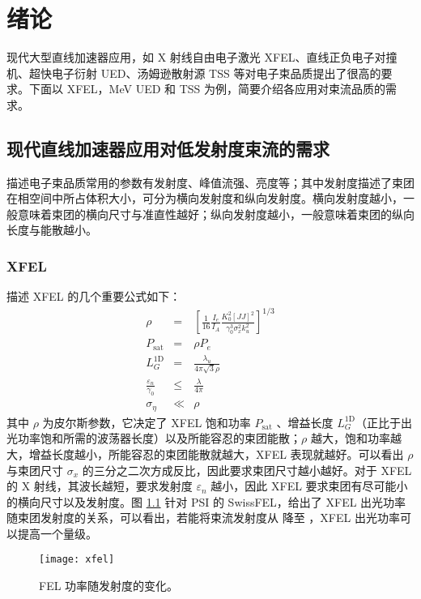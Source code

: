 \chapter{绪论}
\label{chap:intro}

现代大型直线加速器应用，如 X 射线自由电子激光 XFEL、直线正负电子对撞机、超快电子衍射 UED、汤姆逊散射源 TSS 等对电子束品质提出了很高的要求。下面以 XFEL，MeV UED 和 TSS 为例，简要介绍各应用对束流品质的需求。

\section{现代直线加速器应用对低发射度束流的需求}
描述电子束品质常用的参数有发射度、峰值流强、亮度等；其中发射度描述了束团在相空间中所占体积大小，可分为横向发射度和纵向发射度。横向发射度越小，一般意味着束团的横向尺寸与准直性越好；纵向发射度越小，一般意味着束团的纵向长度与能散越小。
\subsection{XFEL}
描述 XFEL 的几个重要公式如下\cite{Huang:2007aa}：
\begin{eqnarray}
\rho &=& \left[\frac{1}{16}\frac{I_e}{I_A}\frac{K_0^2[JJ]^2}{\gamma_0^3\sigma_x^2k_u^2}\right]^{1/3}\\
P_{\text{sat}} &=& \rho P_e\\
L^{\text{1D}}_{G} &=& \frac{\lambda_u}{4\pi\sqrt{3}\rho}\\
\frac{\varepsilon_n}{\gamma_0} &\le& \frac{\lambda}{4\pi}\\
\sigma_{\eta} &\ll& \rho
\end{eqnarray}
其中 $\rho$ 为皮尔斯参数，它决定了 XFEL 饱和功率 $P_{\text{sat}}$ 、增益长度 $L^{\text{1D}}_{G}$（正比于出光功率饱和所需的波荡器长度）以及所能容忍的束团能散；$\rho$ 越大，饱和功率越大，增益长度越小，所能容忍的束团能散就越大，XFEL 表现就越好。可以看出 $\rho$ 与束团尺寸 $\sigma_x$ 的三分之二次方成反比，因此要求束团尺寸越小越好。对于 XFEL 的 X 射线，其波长越短，要求发射度 $\varepsilon_n$ 越小，因此 XFEL 要求束团有尽可能小的横向尺寸以及发射度。图 \ref{fig:xfel} 针对 PSI 的 SwissFEL\cite{Patterson:2010aa}，给出了 XFEL 出光功率随束团发射度的关系，可以看出，若能将束流发射度从  降至 ，XFEL 出光功率可以提高一个量级。
\begin{figure}[htbp]
\centering
\texttt{[image: xfel]}
\caption{\label{fig:xfel} FEL 功率随发射度的变化\cite{prat2014emittance}。}
\end{figure}

